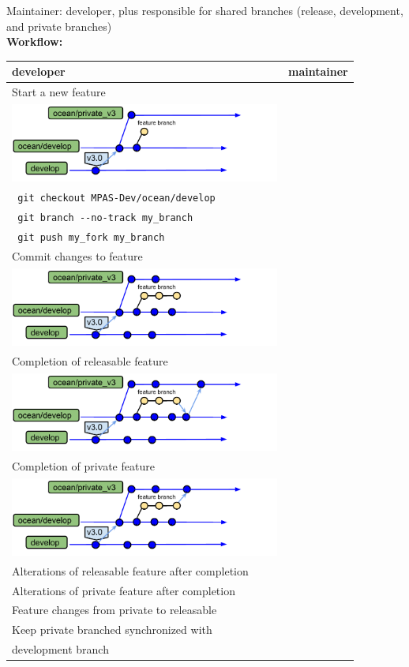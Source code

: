 \documentclass[11pt]{article}
\begin{document}
Maintainer: developer, plus responsible for shared branches (release, development, and private branches)\\

{\bf Workflow:}\\

 \begin{tabular}[c]{l|l}
{\bf developer} & {\bf maintainer} \\
\hline 
 Start a new feature & \\
\includegraphics[width=3.5in]{f/MPASworkflow_1.pdf}& \\
\verb| git checkout MPAS-Dev/ocean/develop | & \\
\verb| git branch --no-track my_branch|  & \\
\verb| git push my_fork my_branch|  & \\
\hline 
 Commit changes to feature & \\
\includegraphics[width=3.5in]{f/MPASworkflow_2.pdf}& \\
\hline 
 Completion of releasable feature & \\
\includegraphics[width=3.5in]{f/MPASworkflow_3.pdf}& \\
\hline 
 Completion of private feature & \\
\includegraphics[width=3.5in]{f/MPASworkflow_4.pdf}& \\
\hline 
 Alterations of releasable feature after completion & \\
\hline 
 Alterations of private feature after completion & \\
\hline 
 Feature changes from private to releasable & \\
\hline 
 Keep private branched synchronized with & \\
 development branch  & \\
 \end{tabular}
\end{document}
